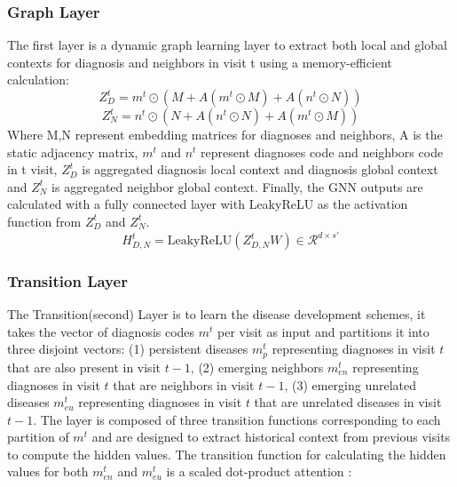 \documentclass[11pt,a4paper,fleqn]{article}
\begin{document}
\subsubsection{Graph Layer}
The first layer is a dynamic graph learning layer to extract both local and
global contexts for diagnosis and neighbors in visit t using a memory-efficient
calculation:
\begin{equation}
  Z_D^t =m^t \odot (M + A(m^t\odot M) + A(n^t\odot N))
\end{equation}
\begin{equation}
  Z_N^t =n^t \odot (N + A(n^t\odot N) + A(m^t\odot M))
\end{equation}
Where M,N represent embedding matrices for diagnoses and neighbors, A is the
static adjacency matrix, $m^t$ and $n^t$ represent diagnoses code and neighbors
code in t visit, $Z_D^t$ is aggregated diagnosis local context and diagnosis
global context and $Z_N^t$ is aggregated neighbor global context. Finally, the
GNN outputs are calculated with a fully connected layer with LeakyReLU as the
activation function from $Z_D^t$ and $Z_N^t$.
\begin{equation}
  H^t_{D,N}=\textrm{LeakyReLU}(Z^t_{D,N}W)\in\mathcal{R}^{d\times s'}
\end{equation}

\subsubsection{Transition Layer}
The Transition(second) Layer is to learn the disease development schemes, it
takes the vector of diagnosis codes $m^t$ per visit as input and partitions it
into three disjoint vectors: (1) persistent diseases $m_p^t$ representing
diagnoses in visit $t$ that are also present in visit $t-1$, (2) emerging
neighbors $m_{en}^t$ representing diagnoses in visit $t$ that are neighbors in
visit $t-1$, (3) emerging unrelated diseases $m_{eu}^t$ representing diagnoses
in visit $t$ that are unrelated diseases in visit $t-1$. The layer is composed
of three transition functions corresponding to each partition of $m^t$ and are
designed to extract historical context from previous visits to compute the
hidden values. The transition function for calculating the hidden values for
both $m_{en}^t$ and $m_{eu}^t$ is a scaled dot-product attention
\cite{dp_attention}: 
\end{document}
